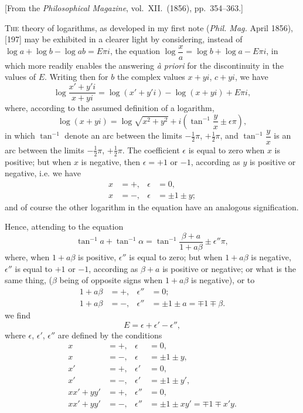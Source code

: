 \documentclass[11pt,a4paper]{book}
\begin{document}
\begin{center}
[From the \textit{Philosophical Magazine}, vol.~XII.~(1856), pp.~354--363.]
\end{center}

\bigskip

T\textsc{he} theory of logarithms, as developed in my first note (\textit{Phil. Mag.} April 1856), [197]
may be exhibited in a clearer light by considering, instead of $\log a + \log b - \log ab = E\pi i$,
the equation $\log \dfrac{x}{a} = \log b + \log a - E\pi i$, in which more readily enables the answering
\textit{\`a priori} for the discontinuity in the values of $E$. Writing then for $b$ the complex
values $x + yi$, $c + yi$, we have
\[
\log\frac{x'+y'i}{x+yi} = \log(x'+y'i) - \log(x+yi) + E\pi i,
\]
where, according to the assumed definition of a logarithm,
\[
\log(x+yi) = \log\sqrt{x^2+y^2} + i\left(\tan^{-1}\frac{y}{x} \pm \epsilon\pi\right),
\]
in which $\tan^{-1}$ denote an arc between the limits $-\tfrac{1}{2}\pi$, $+\tfrac{1}{2}\pi$, and $\tan^{-1}\dfrac{y}{x}$ is an arc between
the limits $-\tfrac{1}{2}\pi$, $+\tfrac{1}{2}\pi$. The coefficient $\epsilon$ is equal to zero when $x$ is positive; but
when $x$ is negative, then $\epsilon = +1$ or $-1$, according as $y$ is positive or negative, i.e. we
have
\begin{align*}
x &= +, & \epsilon &= 0,\\
x &= -, & \epsilon &= \pm 1\pm y;
\end{align*}
and of course the other logarithm in the equation have an analogous signification.

Hence, attending to the equation
\[
\tan^{-1}a + \tan^{-1}\alpha = \tan^{-1}\frac{\beta+a}{1+a\beta}\pm\epsilon''\pi,
\]
where, when $1 + a\beta$ is positive, $\epsilon''$ is equal to zero; but when $1 + a\beta$ is negative,
$\epsilon''$ is equal to $+1$ or $-1$, according as $\beta + a$ is positive or negative; or what is the
same thing, ($\beta$ being of opposite signs when $1 + a\beta$ is negative), or to
\begin{align*}
1 + a\beta &= +, & \epsilon'' &= 0;\\
1 + a\beta &= -, & \epsilon'' &= \pm 1 \pm a = \mp 1 \mp \beta.
\end{align*}
we find
\[
E = \epsilon + \epsilon' - \epsilon'',
\]
where $\epsilon$, $\epsilon'$, $\epsilon''$ are defined by the conditions
\begin{align*}
x &= +, & \epsilon &= 0,\\
x &= -, & \epsilon &= \pm 1 \pm y,\\
x' &= +, & \epsilon' &= 0,\\
x' &= -, & \epsilon' &= \pm 1 \pm y',\\
xx' + yy' &= +, & \epsilon'' &= 0,\\
xx' + yy' &= -, & \epsilon'' &= \pm 1 \pm xy' = \mp 1 \mp x'y.
\end{align*}
\end{document}
